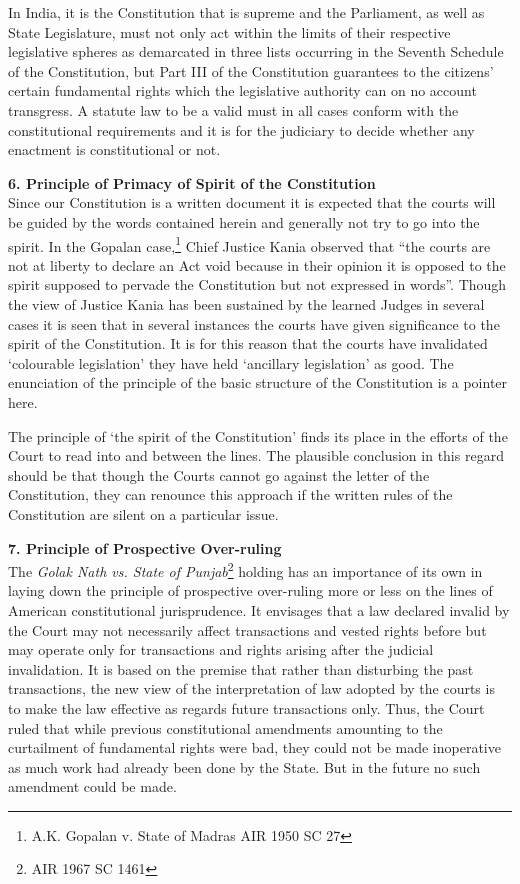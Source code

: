 \begin{multicols}{2}
\noi
In India, it is the Constitution that is supreme and the Parliament, as well as State
Legislature, must not only act within the limits of their respective legislative spheres as
demarcated in three lists occurring in the Seventh Schedule of the Constitution, but Part
III of the Constitution guarantees to the citizens' certain fundamental rights which the
legislative authority can on no account transgress. A statute law to be a valid must in
all cases conform with the constitutional requirements and it is for the judiciary to
decide whether any enactment is constitutional or not.

\noi
{\bf 6. Principle of Primacy of Spirit of the Constitution}\\[0.2cm] Since our Constitution is a written document it is expected that the courts will be guided
by the words contained herein and generally not try to go into the spirit. In the Gopalan
case,\footnote{A.K. Gopalan v. State of Madras AIR 1950 SC 27} Chief Justice Kania observed that “the courts are not at liberty to declare an Act
void because in their opinion it is opposed to the spirit supposed to pervade the
Constitution but not expressed in words”. Though the view of Justice Kania has been
sustained by the learned Judges in several cases it is seen that in several instances the
courts have given significance to the spirit of the Constitution. It is for this reason that
the courts have invalidated ‘colourable legislation’ they have held ‘ancillary legislation’
as good. The enunciation of the principle of the basic structure of the Constitution is a
pointer here.

\noi
The principle of ‘the spirit of the Constitution’ finds its place in the efforts of the Court
to read into and between the lines. The plausible conclusion in this regard should be
that though the Courts cannot go against the letter of the Constitution, they can renounce
this approach if the written rules of the Constitution are silent on a particular issue.

\noi
{\bf 7. Principle of Prospective Over-ruling}\\[0.2cm] 

\noi
The \textit{Golak Nath vs. State of Punjab}\footnote{ AIR 1967 SC 1461} holding has an importance of its own in laying
down the principle of prospective over-ruling more or less on the lines of American
constitutional jurisprudence. It envisages that a law declared invalid by the Court may not necessarily affect transactions and vested rights before but may operate only for
transactions and rights arising after the judicial invalidation. It is based on the premise
that rather than disturbing the past transactions, the new view of the interpretation of
law adopted by the courts is to make the law effective as regards future transactions
only. Thus, the Court ruled that while previous constitutional amendments amounting
to the curtailment of fundamental rights were bad, they could not be made inoperative
as much work had already been done by the State. But in the future no such amendment
could be made.


\end{multicols}
